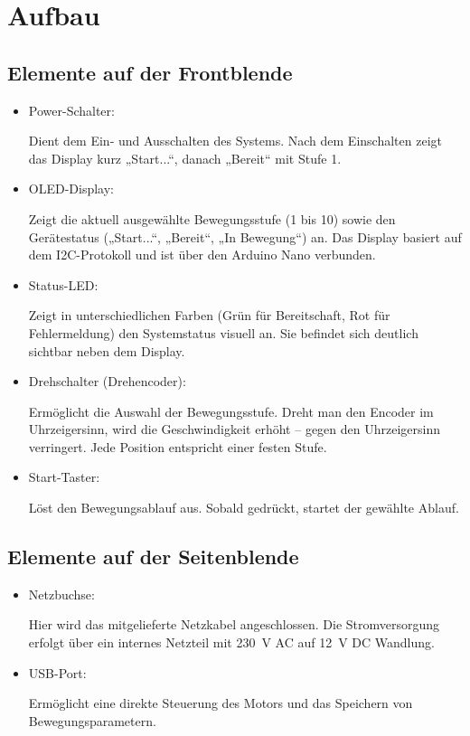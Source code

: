\documentclass[a4paper,12pt]{report}
\begin{document}
	\section {Aufbau}
	\subsection {Elemente auf der Frontblende }
	\begin{itemize}[leftmargin=1.5em]
		
		\item Power-Schalter: 
		
		Dient dem Ein- und Ausschalten des Systems. Nach dem Einschalten zeigt das Display kurz „Start...“, danach „Bereit“ mit Stufe 1. \\
		
		\item OLED-Display: 
		
		Zeigt die aktuell ausgewählte Bewegungsstufe (1 bis 10) sowie den Gerätestatus („Start...“, „Bereit“, „In Bewegung“) an. Das Display basiert auf dem I2C-Protokoll und ist über den Arduino Nano verbunden.\\
		
		\item Status-LED: 
		
		Zeigt in unterschiedlichen Farben (Grün für Bereitschaft, Rot für Fehlermeldung) den Systemstatus visuell an. Sie befindet sich deutlich sichtbar neben dem Display.\\ 
		
		\item Drehschalter (Drehencoder): 
		
		Ermöglicht die Auswahl der Bewegungsstufe. Dreht man den Encoder im Uhrzeigersinn, wird die Geschwindigkeit erhöht – gegen den Uhrzeigersinn verringert. Jede Position entspricht einer festen Stufe.\\
		
		\item Start-Taster: 
		
		Löst den Bewegungsablauf aus. Sobald gedrückt, startet der gewählte Ablauf.\\ 
		
	\end{itemize}
	\newpage
	
	\subsection{Elemente auf der Seitenblende}
	\begin{itemize}[leftmargin=1.5em]
		
		\item Netzbuchse: 
		
		Hier wird das mitgelieferte Netzkabel angeschlossen. Die Stromversorgung erfolgt über ein internes Netzteil mit 230\ V AC auf 12\ V DC Wandlung. \\
		
		\item USB-Port:
		
		Ermöglicht eine direkte Steuerung des Motors und das Speichern von Bewegungsparametern.\\
		
	\end{itemize}
	
\end{document}
